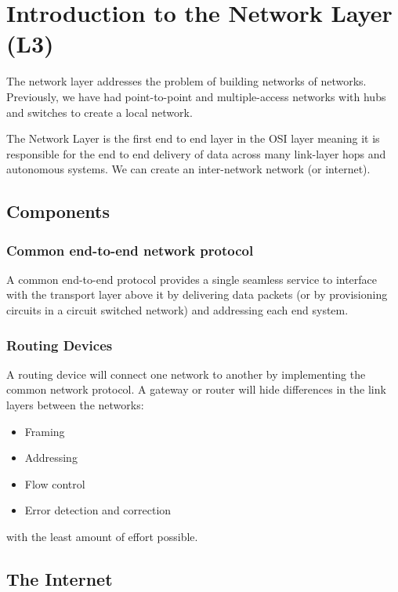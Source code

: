 \section{Introduction to the Network Layer (L3)}\label{sec:introduction_to_the_network_layer}

The network layer addresses the problem of building networks of networks.
Previously, we have had point-to-point and multiple-access networks with hubs and switches to create a local network.

The Network Layer is the first end to end layer in the OSI layer meaning it is responsible for the end to end delivery of data across many link-layer hops and autonomous systems.
We can create an inter-network network (or internet).

\subsection{Components}\label{sub:components_}

\subsubsection{Common end-to-end network protocol}\label{ssub:common_end_to_end_network_protocol}

A common end-to-end protocol provides a single seamless service to interface with the transport layer above it by delivering data packets (or by provisioning circuits in a circuit switched network) and addressing each end system.

\subsubsection{Routing Devices}\label{ssub:routing_devices}

A routing device will connect one network to another by implementing the common network protocol.
A gateway or router will hide differences in the link layers between the networks:
\begin{itemize}
	\item Framing
	\item Addressing
	\item Flow control
	\item Error detection and correction
\end{itemize}
with the least amount of effort possible.

\subsection{The Internet}\label{sub:the_internet}

